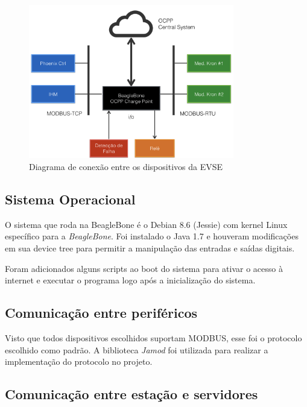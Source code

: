 \begin{figure}[H]
        \begin{center}
                \includegraphics[width=0.8\textwidth,natwidth=400,natheight=288]{assets/images/devices-diagram.png}
                \caption{Diagrama de conexão entre os dispositivos da EVSE}
                \label{fig:proj-diagram}
        \end{center}
\end{figure}

\subsection{Sistema Operacional}

O sistema que roda na BeagleBone é o Debian 8.6 (Jessie) com kernel Linux específico para a \textit{BeagleBone}. Foi instalado o Java 1.7 e houveram modificações em sua device tree para permitir a manipulação das entradas e saídas digitais.

Foram adicionados alguns scripts ao boot do sistema para ativar o acesso à internet e executar o programa logo após a inicialização do sistema.

\subsection{Comunicação entre periféricos}

Visto que todos dispositivos escolhidos suportam MODBUS, esse foi o protocolo escolhido como padrão. A biblioteca \textit{Jamod} foi utilizada para realizar a implementação do protocolo no projeto.

\subsection{Comunicação entre estação e servidores}

